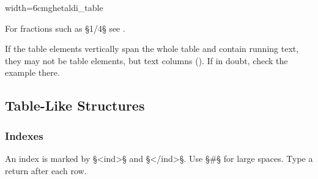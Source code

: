 \vspace{3mm}
\begin{sampleImageSmall}{width=6cm}{ghetaldi_table}

\end{sampleImageSmall}

\vspace{-5mm}
\begin{crossref}
For fractions such as §{1/4}§ see .
\end{crossref}

\vspace{3mm}
\begin{note}
If the table elements vertically span the whole table and contain running text, they may not be table elements, but text columns (). If in doubt, check the example there.
\end{note}



\tocspace
\subsection{Table-Like Structures}
\label{section table-like structures}

\subsubsection{Indexes}
\label{section indexes}

\begin{mainrule}
An index is marked by §<ind>§ and §</ind>§. Use §#§ for large spaces. Type a return after each row.
\end{mainrule}

